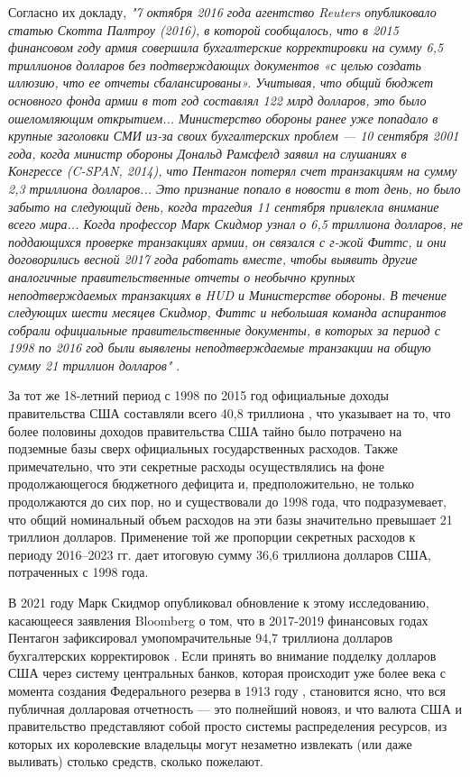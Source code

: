 \documentclass[10pt,twocolumn,letterpaper]{article}
\begin{document}
Согласно их докладу, \textit{"7 октября 2016 года агентство Reuters опубликовало статью Скотта Палтроу (2016), в которой сообщалось, что в 2015 финансовом году армия совершила бухгалтерские корректировки на сумму 6,5 триллионов долларов без подтверждающих документов «с целью создать иллюзию, что ее отчеты сбалансированы». Учитывая, что общий бюджет основного фонда армии в тот год составлял 122 млрд долларов, это было ошеломляющим открытием... Министерство обороны ранее уже попадало в крупные заголовки СМИ из-за своих бухгалтерских проблем — 10 сентября 2001 года, когда министр обороны Дональд Рамсфелд заявил на слушаниях в Конгрессе (C-SPAN, 2014), что Пентагон потерял счет транзакциям на сумму 2,3 триллиона долларов... Это признание попало в новости в тот день, но было забыто на следующий день, когда трагедия 11 сентября привлекла внимание всего мира... Когда профессор Марк Скидмор узнал о 6,5 триллиона долларов, не поддающихся проверке транзакциях армии, он связался с г-жой Фиттс, и они договорились весной 2017 года работать вместе, чтобы выявить другие аналогичные правительственные отчеты о необычно крупных неподтверждаемых транзакциях в HUD и Министерстве обороны. В течение следующих шести месяцев Скидмор, Фиттс и небольшая команда аспирантов собрали официальные правительственные документы, в которых за период с 1998 по 2016 год были выявлены неподтверждаемые транзакции на общую сумму 21 триллион долларов"} \cite{12}.

За тот же 18-летний период с 1998 по 2015 год официальные доходы правительства США составляли всего 40,8 триллиона \cite{15}, что указывает на то, что более половины доходов правительства США тайно было потрачено на подземные базы сверх официальных государственных расходов. Также примечательно, что эти секретные расходы осуществлялись на фоне продолжающегося бюджетного дефицита и, предположительно, не только продолжаются до сих пор, но и существовали до 1998 года, что подразумевает, что общий номинальный объем расходов на эти базы значительно превышает 21 триллион долларов. Применение той же пропорции секретных расходов к периоду 2016–2023 гг. дает итоговую сумму 36,6 триллиона долларов США, потраченных с 1998 года.

В 2021 году Марк Скидмор опубликовал обновление к этому исследованию, касающееся заявления Bloomberg о том, что в 2017-2019 финансовых годах Пентагон зафиксировал умопомрачительные 94,7 триллиона долларов бухгалтерских корректировок \cite{17,18}. Если принять во внимание подделку долларов США через систему центральных банков, которая происходит уже более века с момента создания Федерального резерва в 1913 году \cite{37}, становится ясно, что вся публичная долларовая отчетность — это полнейший новояз, и что валюта США и правительство представляют собой просто системы распределения ресурсов, из которых их королевские владельцы могут незаметно извлекать (или даже выливать) столько средств, сколько пожелают.
\end{document}
